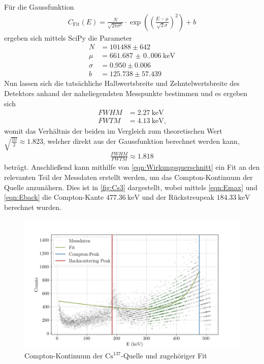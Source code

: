 Für die Gaussfunktion
\begin{align*}
  C_\text{Fit}(E)=\frac{N}{\sqrt{2\pi\sigma^2}}\cdot\exp{\left(\left(\frac{E-\mu}{\sqrt{2}\sigma}\right)^2\right)}+b
\end{align*}
ergeben sich mittels SciPy die Parameter
\begin{align*}
  N &= 101488\pm642\\
  \mu &= \SI{661.687(0.006)}{\kilo\eV}\\
  \sigma &= 0.950\pm0.006\\
  b &= 125.738\pm57.439
\end{align*}
Nun lassen sich die tatsächliche Halbwertsbreite und Zehntelwertsbreite des Detektors anhand der naheliegendsten Messpunkte bestimmen und es ergeben sich
\begin{align*}
  FWHM&=\SI{2.27}{\kilo\eV}\\
  FWTM&=\SI{4.13}{\kilo\eV}\text{,}
\end{align*}
womit das Verhältnis der beiden im Vergleich zum theoretischen Wert $\sqrt{\frac{10}{2}}\approx1.823$, welcher direkt aus der Gaussfunktion berechnet werden kann,
\begin{align*}
  \frac{FWHM}{FWTM}\approx1.818
\end{align*}
beträgt.
Anschließend kann mithilfe von \autoref{eqn:Wirkungsquerschnitt} ein Fit an den relevanten Teil der Messdaten erstellt werden, um das Compton-Kontinuum der Quelle anzunähern.
Dies ist in \autoref{fig:Cs3} dargestellt, wobei mittels \autoref{eqn:Emax} und \autoref{eqn:Eback} die Compton-Kante $\SI{477.36}{\kilo\eV}$ und der Rückstreupeak $\SI{184.33}{\kilo\eV}$ berechnet wurden.
\begin{figure}[H]
  \centering
  \includegraphics[scale=0.65]{Skripte/137Caesium_compton.png}
  \caption{Compton-Kontinuum der $\text{Cs}^{137}$-Quelle und zugehöriger Fit}
  \label{fig:Cs3}
\end{figure}
